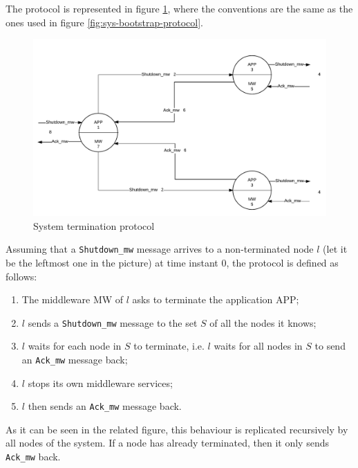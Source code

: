 The protocol is represented in figure \ref{fig:sys-termination-protocol}, where
the conventions are the same as the ones used in figure
\ref{fig:sys-bootstrap-protocol}.

\begin{figure}[H]
  \centering
  \includegraphics[width=\columnwidth]{sections/images/solution/termination.pdf}
  \caption{System termination protocol}
  \label{fig:sys-termination-protocol}
\end{figure}

Assuming that a \texttt{Shutdown\_mw} message arrives to a non-terminated node
$l$ (let it be the leftmost one in the picture) at time instant 0, the protocol
is defined as follows:

\begin{enumerate}
  \item The middleware MW of $l$ asks to terminate the application APP;
  \item $l$ sends a \texttt{Shutdown\_mw} message to the set
    $S$ of all the nodes it knows;
  \item $l$ waits for each node in $S$ to terminate, i.e. $l$ waits for all
    nodes in $S$ to send an \texttt{Ack\_mw} message back;
  \item $l$ stops its own middleware services;
  \item $l$ then sends an \texttt{Ack\_mw} message back.
\end{enumerate}

As it can be seen in the related figure, this behaviour is replicated
recursively by all nodes of the system. If a node has already terminated, then
it only sends \texttt{Ack\_mw} back.
